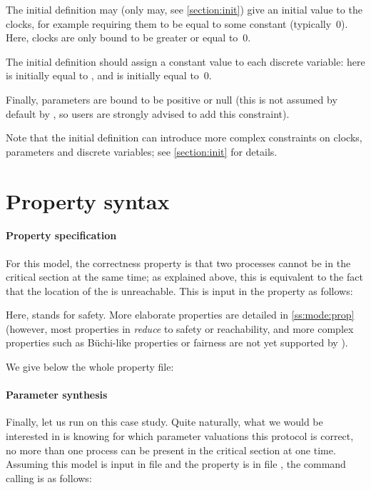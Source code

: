 The initial definition may (only may, see \cref{section:init}) give an initial value to the clocks, for example requiring them to be equal to some constant (typically~0).
Here, clocks are only bound to be greater or equal to~0.

The initial definition should assign a constant value to each discrete variable:
here  is initially equal to , and  is initially equal to~0.

Finally, parameters are bound to be positive or null (this is not assumed by default by \imitator{}, so users are strongly advised to add this constraint).

Note that the initial definition can introduce more complex constraints on clocks, parameters and discrete variables; see \cref{section:init} for details.

\section{Property syntax}

\paragraph{Property specification}
For this model, the correctness property is that two processes cannot be in the critical section at the same time; as explained above, this is equivalent to the fact that the  location of the  \IPTA{} is unreachable.
This is input in the property as follows:
\begin{center}
\end{center}
Here,  stands for safety.
More elaborate properties are detailed in \cref{ss:mode:prop} (however, most properties in \imitator{} \emph{reduce} to safety or reachability, and more complex properties such as Büchi-like properties or fairness are not yet supported by \imitator{}).

We give below the whole property file:




\paragraph{Parameter synthesis}
Finally, let us run \imitator{} on this case study.
Quite naturally, what we would be interested in is knowing for which parameter valuations this protocol is correct, \ie{} no more than one process can be present in the critical section at one time.
Assuming this model is input in file  and the property is in file , the command calling \imitator{} is as follows:

